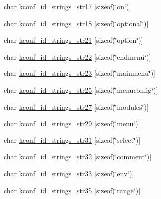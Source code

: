 \begin{DoxyCompactItemize}
\item 
char \hyperlink{structkconf__id__strings__t_ac7545ba5f98b74c0999c8de37d0d150f}{kconf\-\_\-id\-\_\-strings\-\_\-str17} \mbox{[}sizeof(\char`\"{}on\char`\"{})\mbox{]}
\item 
char \hyperlink{structkconf__id__strings__t_a5dd06a477c799528672ffca9b1b04fd3}{kconf\-\_\-id\-\_\-strings\-\_\-str18} \mbox{[}sizeof(\char`\"{}optional\char`\"{})\mbox{]}
\item 
char \hyperlink{structkconf__id__strings__t_a3669d5383fbdac7ac807b86c91405387}{kconf\-\_\-id\-\_\-strings\-\_\-str21} \mbox{[}sizeof(\char`\"{}option\char`\"{})\mbox{]}
\item 
char \hyperlink{structkconf__id__strings__t_a2b0e0f615ab87c7c779d9eec88b1ae70}{kconf\-\_\-id\-\_\-strings\-\_\-str22} \mbox{[}sizeof(\char`\"{}endmenu\char`\"{})\mbox{]}
\item 
char \hyperlink{structkconf__id__strings__t_aabce91bae44b6cf451a20e206fe084dc}{kconf\-\_\-id\-\_\-strings\-\_\-str23} \mbox{[}sizeof(\char`\"{}mainmenu\char`\"{})\mbox{]}
\item 
char \hyperlink{structkconf__id__strings__t_a586c894c4817bfce34d37bf9c619d8fc}{kconf\-\_\-id\-\_\-strings\-\_\-str25} \mbox{[}sizeof(\char`\"{}menuconfig\char`\"{})\mbox{]}
\item 
char \hyperlink{structkconf__id__strings__t_a4d81fb91b482ca123efece978a71d340}{kconf\-\_\-id\-\_\-strings\-\_\-str27} \mbox{[}sizeof(\char`\"{}modules\char`\"{})\mbox{]}
\item 
char \hyperlink{structkconf__id__strings__t_ad3bc5950b4a171c81be43bbbef0baff5}{kconf\-\_\-id\-\_\-strings\-\_\-str29} \mbox{[}sizeof(\char`\"{}menu\char`\"{})\mbox{]}
\item 
char \hyperlink{structkconf__id__strings__t_a442a2ee75b5ec18aa53e0856f31689af}{kconf\-\_\-id\-\_\-strings\-\_\-str31} \mbox{[}sizeof(\char`\"{}select\char`\"{})\mbox{]}
\item 
char \hyperlink{structkconf__id__strings__t_abee40ae7e8a319f3996274087930616a}{kconf\-\_\-id\-\_\-strings\-\_\-str32} \mbox{[}sizeof(\char`\"{}comment\char`\"{})\mbox{]}
\item 
char \hyperlink{structkconf__id__strings__t_af3f19572d3d5142cde1c66ff387d0578}{kconf\-\_\-id\-\_\-strings\-\_\-str33} \mbox{[}sizeof(\char`\"{}env\char`\"{})\mbox{]}
\item 
char \hyperlink{structkconf__id__strings__t_a5d1d9c31e13eb5411923a1570f900fc3}{kconf\-\_\-id\-\_\-strings\-\_\-str35} \mbox{[}sizeof(\char`\"{}range\char`\"{})\mbox{]}
\item 

\end{DoxyCompactItemize}
